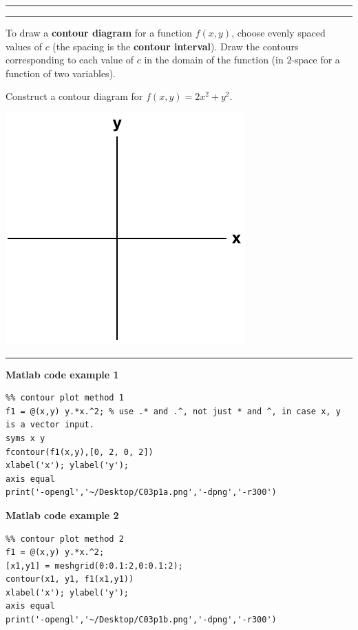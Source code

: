 \documentclass[12pt,letterpaper,noanswers]{exam}
\begin{document}


\vspace{0.2cm}
\hrule
\vspace{0.2cm}


\vspace{0.2cm}
\hrule
\vspace{0.2cm}
\begin{tcolorbox}
To draw a \textbf{contour diagram} for a function $f(x,y)$, choose evenly spaced values of $c$ (the spacing is the \textbf{contour interval}).  Draw the contours corresponding to each value of $c$ in the domain of the function (in $2$-space for a function of two variables).
\end{tcolorbox}

Construct a contour diagram for $f(x,y) = 2x^2 + y^2.$

\includegraphics[scale=0.6]{img/C02axes-2.png}

\vspace{0.2cm}
\hrule
\vspace{0.2cm}


\eject

\noindent\textbf{Matlab code example 1}
\begin{lstlisting}
%% contour plot method 1
f1 = @(x,y) y.*x.^2; % use .* and .^, not just * and ^, in case x, y is a vector input.
syms x y
fcontour(f1(x,y),[0, 2, 0, 2])
xlabel('x'); ylabel('y');
axis equal
print('-opengl','~/Desktop/C03p1a.png','-dpng','-r300')
\end{lstlisting}

\noindent\textbf{Matlab code example 2}
\begin{lstlisting}
%% contour plot method 2
f1 = @(x,y) y.*x.^2;
[x1,y1] = meshgrid(0:0.1:2,0:0.1:2);
contour(x1, y1, f1(x1,y1))
xlabel('x'); ylabel('y');
axis equal
print('-opengl','~/Desktop/C03p1b.png','-dpng','-r300')
\end{lstlisting}
\end{document}
